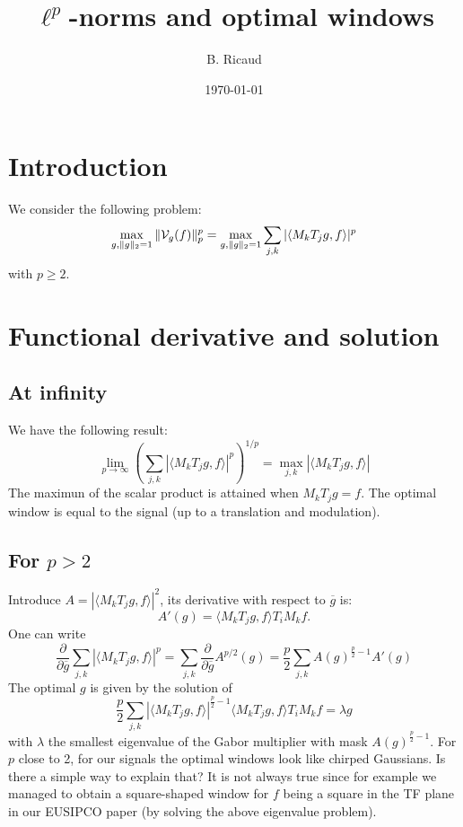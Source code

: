 \documentclass[11pt]{article}
\title{$\ell^p$-norms and optimal windows}
\author{B. Ricaud}
\date{\today}
\begin{document}
\maketitle


\section{Introduction}
We consider the following problem:
$$\max_{g,\|g\|_2=1} \| {\cal V}_g(f)\|_p^p=\max_{g,\|g\|_2=1}  \sum_{j,k}|\langle M_kT_jg , f\rangle |^p
$$
with $p\ge 2$.
\section{Functional derivative and solution}
\subsection{At infinity}
We have the following result:
$$\lim_{p\to\infty}\left(\sum_{j,k}|\langle M_kT_jg , f\rangle |^p\right)^{1/p}=\max_{j,k}|\langle M_kT_jg , f\rangle |
$$
The maximun of the scalar product is attained when  $M_kT_jg=f$. The optimal window is equal to the signal (up to a translation and modulation).

\subsection{For $p>2$}
Introduce $A=|\langle M_kT_jg , f\rangle |^2$, its derivative with respect to $\overline{g}$ is:
$$A'(g)=\langle M_kT_jg , f\rangle T_iM_kf.
$$
One can write
$$\frac{\partial}{\partial \overline{g}}\sum_{j,k}|\langle M_kT_jg , f\rangle |^p=\sum_{j,k}\frac{\partial}{\partial \overline{g}}A^{p/2}(g)=\frac{p}{2}\sum_{j,k} A(g)^{\frac{p}{2}-1} A'(g)
$$
The optimal $g$ is given by the solution of
$$\frac{p}{2}\sum_{j,k}  |\langle M_kT_jg , f\rangle |^{\frac{p}{2}-1}  \langle M_kT_jg , f\rangle T_iM_kf=\lambda g
$$
with $\lambda$ the smallest eigenvalue of the Gabor multiplier with mask $A(g)^{\frac{p}{2}-1} $.
{\color{red} For $p$ close to 2, for our signals the optimal windows look like chirped Gaussians. Is there a simple way to explain that? It is not always true since for example we managed to obtain a square-shaped window for $f$ being a square in the TF plane in our EUSIPCO paper (by solving the above eigenvalue problem).}
\end{document}
